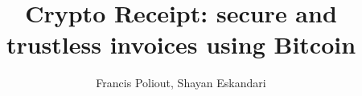 \documentclass[envcountsect]{llncs}
\begin{document}
\frontmatter
\mainmatter

\title{\Large \bf{Crypto Receipt}: secure and trustless invoices using Bitcoin}

\author{Francis Poliout, Shayan Eskandari}




\maketitle













\clearpage
\appendix
\end{document}
